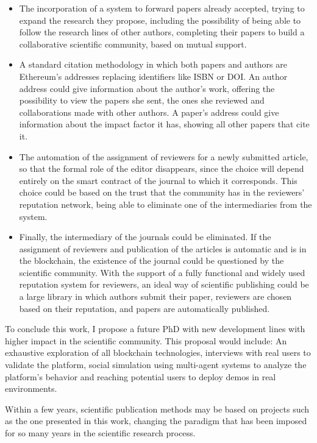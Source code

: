 \begin{itemize}
\item The incorporation of a system to forward papers already accepted, trying
  to expand the research they propose, including the possibility of being able
  to follow the research lines of other authors, completing their papers to
  build a collaborative scientific community, based on mutual support.
\item A standard citation methodology in which both papers and authors are
  Ethereum's addresses replacing identifiers like ISBN or DOI. An author address
  could give information about the author's work, offering the possibility to
  view the papers she sent, the ones she reviewed and collaborations made with
  other authors. A paper's address could give information about the impact
  factor it has, showing all other papers that cite it.
\item The automation of the assignment of reviewers for a newly submitted
  article, so that the formal role of the editor disappears, since the choice
  will depend entirely on the smart contract of the journal to which it
  corresponds. This choice could be based on the trust that the community has in
  the reviewers' reputation network, being able to eliminate one of the
  intermediaries from the system.
\item Finally, the intermediary of the journals could be eliminated. If the
  assignment of reviewers and publication of the articles is automatic and is in
  the blockchain, the existence of the journal could be questioned by the
  scientific community. With the support of a fully functional and widely used
  reputation system for reviewers, an ideal way of scientific publishing could
  be a large library in which authors submit their paper, reviewers are chosen
  based on their reputation, and papers are automatically published.
\end{itemize}

To conclude this work, I propose a future PhD with new development lines with
higher impact in the scientific community. This proposal would include: An
exhaustive exploration of all blockchain technologies, interviews with real
users to validate the platform, social simulation using multi-agent systems to
analyze the platform's behavior and reaching potential users to deploy demos in
real environments.

Within a few years, scientific publication methods may be based on projects such
as the one presented in this work, changing the paradigm that has been imposed
for so many years in the scientific research process.

